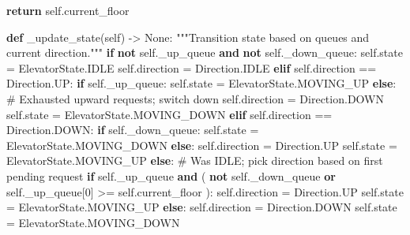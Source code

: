 \documentclass[11pt]{article}
\newenvironment{Shaded}{\begin{snugshade}}{\end{snugshade}}
\newcommand{\CommentTok}[1]{\textcolor[rgb]{0.48,0.49,0.49}{#1}}
\newcommand{\ControlFlowTok}[1]{\textcolor[rgb]{0.99,0.74,0.29}{\textbf{#1}}}
\newcommand{\DecValTok}[1]{\textcolor[rgb]{0.96,0.45,0.00}{#1}}
\newcommand{\KeywordTok}[1]{\textcolor[rgb]{0.81,0.81,0.76}{\textbf{#1}}}
\newcommand{\NormalTok}[1]{\textcolor[rgb]{0.81,0.81,0.76}{#1}}
\newcommand{\OperatorTok}[1]{\textcolor[rgb]{0.81,0.81,0.76}{#1}}
\newcommand{\VariableTok}[1]{\textcolor[rgb]{0.15,0.68,0.68}{#1}}
\begin{document}
\begin{Shaded}
\begin{Highlighting}[]
        \ControlFlowTok{return} \VariableTok{self}\NormalTok{.current\_floor}

    \KeywordTok{def}\NormalTok{ \_update\_state(}\VariableTok{self}\NormalTok{) }\OperatorTok{{-}\textgreater{}} \VariableTok{None}\NormalTok{:}
        \CommentTok{"""Transition state based on queues and current direction."""}
        \ControlFlowTok{if} \KeywordTok{not} \VariableTok{self}\NormalTok{.\_up\_queue }\KeywordTok{and} \KeywordTok{not} \VariableTok{self}\NormalTok{.\_down\_queue:}
            \VariableTok{self}\NormalTok{.state }\OperatorTok{=}\NormalTok{ ElevatorState.IDLE}
            \VariableTok{self}\NormalTok{.direction }\OperatorTok{=}\NormalTok{ Direction.IDLE}
        \ControlFlowTok{elif} \VariableTok{self}\NormalTok{.direction }\OperatorTok{==}\NormalTok{ Direction.UP:}
            \ControlFlowTok{if} \VariableTok{self}\NormalTok{.\_up\_queue:}
                \VariableTok{self}\NormalTok{.state }\OperatorTok{=}\NormalTok{ ElevatorState.MOVING\_UP}
            \ControlFlowTok{else}\NormalTok{:}
                \CommentTok{\# Exhausted upward requests; switch down}
                \VariableTok{self}\NormalTok{.direction }\OperatorTok{=}\NormalTok{ Direction.DOWN}
                \VariableTok{self}\NormalTok{.state }\OperatorTok{=}\NormalTok{ ElevatorState.MOVING\_DOWN}
        \ControlFlowTok{elif} \VariableTok{self}\NormalTok{.direction }\OperatorTok{==}\NormalTok{ Direction.DOWN:}
            \ControlFlowTok{if} \VariableTok{self}\NormalTok{.\_down\_queue:}
                \VariableTok{self}\NormalTok{.state }\OperatorTok{=}\NormalTok{ ElevatorState.MOVING\_DOWN}
            \ControlFlowTok{else}\NormalTok{:}
                \VariableTok{self}\NormalTok{.direction }\OperatorTok{=}\NormalTok{ Direction.UP}
                \VariableTok{self}\NormalTok{.state }\OperatorTok{=}\NormalTok{ ElevatorState.MOVING\_UP}
        \ControlFlowTok{else}\NormalTok{:}
            \CommentTok{\# Was IDLE; pick direction based on first pending request}
            \ControlFlowTok{if} \VariableTok{self}\NormalTok{.\_up\_queue }\KeywordTok{and}\NormalTok{ (}
                \KeywordTok{not} \VariableTok{self}\NormalTok{.\_down\_queue }\KeywordTok{or} \VariableTok{self}\NormalTok{.\_up\_queue[}\DecValTok{0}\NormalTok{] }\OperatorTok{\textgreater{}=} \VariableTok{self}\NormalTok{.current\_floor}
\NormalTok{            ):}
                \VariableTok{self}\NormalTok{.direction }\OperatorTok{=}\NormalTok{ Direction.UP}
                \VariableTok{self}\NormalTok{.state }\OperatorTok{=}\NormalTok{ ElevatorState.MOVING\_UP}
            \ControlFlowTok{else}\NormalTok{:}
                \VariableTok{self}\NormalTok{.direction }\OperatorTok{=}\NormalTok{ Direction.DOWN}
                \VariableTok{self}\NormalTok{.state }\OperatorTok{=}\NormalTok{ ElevatorState.MOVING\_DOWN}


\end{Highlighting}
\end{Shaded}
\end{document}
